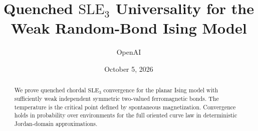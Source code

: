 \documentclass[11pt]{article}
\title{Quenched $\mathrm{SLE}_3$ Universality for the\\ Weak Random-Bond Ising Model}
\author{OpenAI}
\date{October 5, 2026}
\numberwithin{equation}{section}
\theoremstyle{definition}
\theoremstyle{remark}
\newcommand{\1}{\mathbf 1}
\begin{document}
\maketitle
\begin{abstract}
We prove quenched chordal $\mathrm{SLE}_3$ convergence for the planar Ising
model with sufficiently weak independent symmetric two-valued ferromagnetic
bonds. The temperature is the critical point defined by spontaneous
magnetization. Convergence holds in probability over environments for the
full oriented curve law in deterministic Jordan-domain approximations.
\end{abstract}
\tableofcontents










\end{document}
